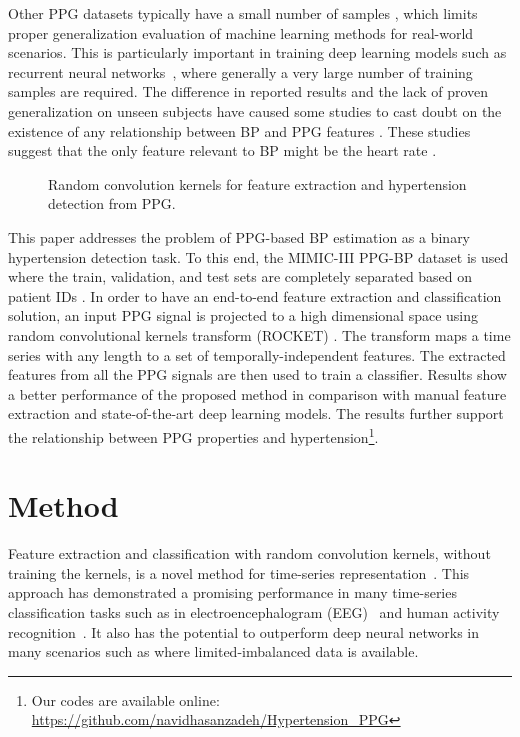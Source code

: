 \documentclass[letterpaper, 10 pt, conference]{ieeeconf}
\begin{document}
Other PPG datasets typically have a small number of samples \cite{liang2018new}, which limits proper generalization evaluation of machine learning methods for real-world scenarios. This is particularly important in training deep learning models such as recurrent neural networks~\cite{salehinejad2017recent}, where generally a very large number of training samples are required.  
The difference in reported results and the lack of proven generalization on unseen subjects have caused some studies to cast doubt on the existence of any relationship between BP and PPG features \cite{weber2023intensive, bulhoes2022blood}. These studies suggest that the only feature relevant to BP might be the heart rate \cite{mehta2023can}.






\begin{figure*}[t]
	\centering
	\caption{Random convolution kernels for feature extraction and hypertension detection from PPG.}
	\vspace{-4mm}
\label{figure:diagram}
\end{figure*}


This paper addresses the problem of PPG-based BP estimation as a binary hypertension detection task. To this end, the MIMIC-III PPG-BP dataset is used where the train, validation, and test sets are completely separated based on patient IDs \cite{schrumpf2021assessment}. In order to have an end-to-end feature extraction and classification solution, 
an input PPG signal is projected to a high dimensional space using random convolutional kernels transform (ROCKET) \cite{dempster2021MiniROCKET}. The transform maps a time series with any length to a set of temporally-independent features. The extracted features from all the PPG signals are then used to train a classifier.
 Results show a better performance of the proposed method in comparison with manual feature extraction and state-of-the-art deep learning models. The results further support the relationship between PPG properties and hypertension\footnote{Our codes are available online: \url{https://github.com/navidhasanzadeh/Hypertension_PPG}}.



\section{Method}

Feature extraction and classification with random convolution kernels, without training the kernels, is a novel method for time-series representation~\cite{dempster2021MiniROCKET,salehinejad2022s}. This approach has demonstrated a promising performance in many time-series classification tasks such as in electroencephalogram (EEG)~\cite{lundy2021random} and human activity recognition~\cite{salehinejad2022litehar,salehinejad2023joint}. It also has the potential to outperform deep neural networks in many scenarios such as where limited-imbalanced data is available. 
\end{document}
